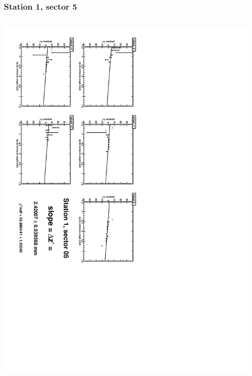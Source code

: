\documentclass[compress]{beamer}
\begin{document}
\begin{frame}
\frametitle{Station 1, sector 5}
\begin{columns}
\includegraphics[height=\linewidth, angle=90]{zfits/zfit_1_05.pdf}


\end{columns}
\end{frame}
\end{document}
